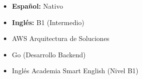 %
%
%

\twocolumnsection
{
\vspace{1em}
\begin{itemize}
	\item \textbf{Español:} Nativo
	\item \textbf{Inglés:} B1 (Intermedio)
\end{itemize}
}
{
\vspace{1em}
\begin{itemize}
	\item AWS Arquitectura de Soluciones
	\item Go (Desarrollo Backend)
	\item Inglés Academia Smart English (Nivel B1)
\end{itemize}
}
